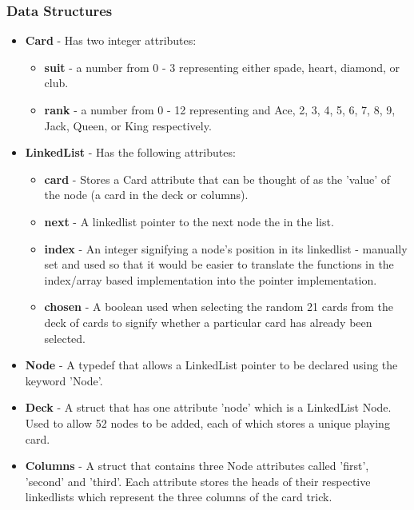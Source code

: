 \documentclass[11]{article}
\begin{document}
			\subsubsection{Data Structures}
				\begin{itemize}
					\item \textbf{Card} - Has two integer attributes:
						\begin{itemize}
							\item \textbf{suit} - a number from 0 - 3 representing either spade, heart, diamond, or club.
							\item \textbf{rank} - a number from 0 - 12 representing and Ace, 2, 3, 4, 5, 6, 7, 8, 9, Jack, Queen, or King respectively.
						\end{itemize}
						
					\item \textbf{LinkedList} - Has the following attributes: 
						\begin{itemize}
							\item \textbf{card} - Stores a Card attribute that can be thought of as the 'value' of the node (a card in the deck or columns).
							\item \textbf{next} - A linkedlist pointer to the next node the in the list.
							\item \textbf{index} - An integer signifying a node's position in its linkedlist - manually set and used so that it would be easier to translate the functions in the index/array based implementation into the pointer implementation.
							
							\item \textbf{chosen} - A boolean used when selecting the random 21 cards from the deck of cards to signify whether a particular card has already been selected.
						\end{itemize}
						
					\item \textbf{Node} - A typedef that allows a LinkedList pointer to be declared using the keyword 'Node'.										
					
					\item \textbf{Deck} - A struct that has one attribute 'node' which is a LinkedList Node. Used to allow 52 nodes to be added, each of which stores a unique playing card.
					
					\item \textbf{Columns} - A struct that contains three Node attributes called 'first', 'second' and 'third'. Each attribute stores the heads of their respective linkedlists which represent the three columns of the card trick.
				\end{itemize}
\end{document}
